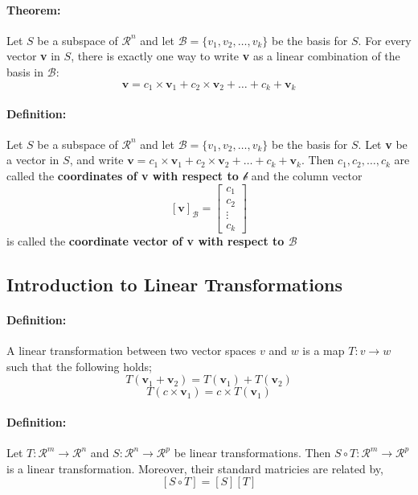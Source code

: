 \documentclass[12pt]{article}
\newenvironment{theorem}{\paragraph{Theorem:\hfill}}{\hfill}
\newenvironment{definition}{\paragraph{Definition: }}{\hfill}
\begin{document}
\begin{theorem}
	Let $S$ be a subspace of $\mathcal{R}^n$ and let $\mathcal{B} = \{v_1, v_2, \dots, v_k \}$ be the basis for $S$. For every vector \textbf{v} in $S$, there is exactly one way to write \textbf{v} as a linear combination of the basis in $\mathcal{B}$:
	\[
	\textbf{v} = 
	c_1 \times \textbf{v}_1 + c_2 \times \textbf{v}_2 + \dots + c_k + \textbf{v}_k
	\]
\end{theorem}

\begin{definition}
	Let $S$ be a subspace of $\mathcal{R}^n$ and let $\mathcal{B} = \{v_1, v_2, \dots, v_k \}$ be the basis for $S$. Let \textbf{v} be a vector in $S$, and write $\textbf{v} = c_1 \times \textbf{v}_1 + c_2 \times \textbf{v}_2 + \dots + c_k + \textbf{v}_k$. Then $c_1, c_2, \dots, c_k$ are called the \textbf{coordinates of v with respect to $\mathcal{b}$} and the column vector
	\[
		\left[ \textbf{v} \right]_{\mathcal{B}} = 
		\begin{bmatrix}
		c_{1}\\
		c_{2}\\
		\vdots \\
		c_{k}
		\end{bmatrix}
	\]
	is called the \textbf{coordinate vector of v with respect to $\mathcal{B}$}
\end{definition}


\subsection{Introduction to Linear Transformations}

\begin{definition}
	A linear transformation between two vector spaces $v$ and $w$ is a map $T: v \rightarrow w$ such that the following holds;
	\[
	T(\textbf{v}_1 + \textbf{v}_2) = T(\textbf{v}_1) + T(\textbf{v}_2)
	\]
	\[
	T(c \times \textbf{v}_1) = c \times T(\textbf{v}_1)
	\]
\end{definition}

\begin{definition}
	Let $T: \mathcal{R}^m \rightarrow \mathcal{R}^n$ and $S: \mathcal{R}^n \rightarrow \mathcal{R}^p$ be linear transformations. Then $S \circ T: \mathcal{R}^m \rightarrow \mathcal{R}^p$ is a linear transformation. Moreover, their standard matricies are related by,
	\[
	\left[ S \circ T \right] = \left[ S \right] \left[ T \right]
	\]
\end{definition}
\end{document}
